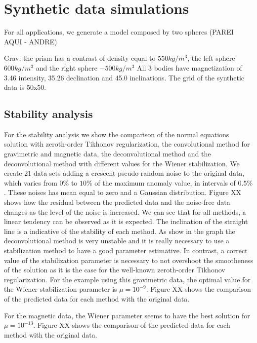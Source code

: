 \section{Synthetic data simulations}
\label{sec:synthetic_simulations}

For all applications, we generate a model composed by two spheres (PAREI AQUI - ANDRE)

Grav: the prism has a contrast of density equal to $550 kg/m^3$, the left sphere $600 kg/m^3$ and the right sphere $-500 kg/m^3$
All 3 bodies have magnetization of 3.46 intensity, 35.26 declination and 45.0 inclinations.
The grid of the synthetic data is 50x50.


\subsection{Stability analysis}

For the stability analysis we show the comparison of the normal equations solution with zeroth-order Tikhonov regularization, the convolutional method for gravimetric and magnetic data, the deconvolutional method and the deconvolutional method with different values for the Wiener stabilization. We create $21$ data sets adding a crescent pseudo-random noise to the original data, which varies from $0\%$ to $10\%$ of the maximum anomaly value, in intervals of $0.5\%$. These noises has mean equal to zero and a Gaussian distribution.
Figure XX shows how the residual between the predicted data and the noise-free data changes as the level of the noise is increased. We can see that for all methods, a linear tendency can be observed as it is expected. The inclination of the straight line is a indicative of the stability of each method. As show in the graph the deconvolutional method is very unstable and it is really necessary to use a stabilization method to have a good parameter estimative. In contrast, a correct value of the stabilization parameter is necessary to not overshoot the smootheness of the solution as it is the case for the well-known zeroth-order Tikhonov regularization. For the example using this gravimetric data, the optimal value for the Wiener stabilization parameter is $\mu = 10^{-9}$. Figure XX shows the comparison of the predicted data for each method with the original data.

For the magnetic data, the Wiener parameter seems to have the best solution for $\mu = 10^{-13}$. Figure XX shows the comparison of the predicted data for each method with the original data.


